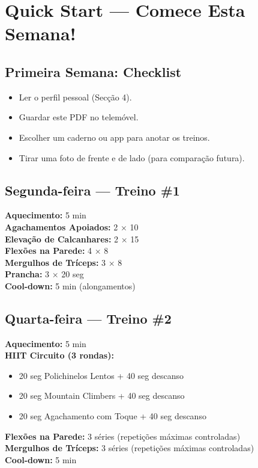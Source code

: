 \documentclass[12pt,a4paper]{scrartcl}
\begin{document}
\section{Quick Start — Comece Esta Semana!}
\subsection{Primeira Semana: Checklist}
\begin{itemize}
    \item[$\checkmark$] Ler o perfil pessoal (Secção 4).
    \item[$\checkmark$] Guardar este PDF no telemóvel.
    \item[$\checkmark$] Escolher um caderno ou app para anotar os treinos.
    \item[$\checkmark$] Tirar uma foto de frente e de lado (para comparação futura).
\end{itemize}

\subsection{Segunda-feira — Treino \#1}
\textbf{Aquecimento:} 5 min \\
\textbf{Agachamentos Apoiados:} 2 × 10 \\
\textbf{Elevação de Calcanhares:} 2 × 15 \\
\textbf{Flexões na Parede:} 4 × 8 \\
\textbf{Mergulhos de Tríceps:} 3 × 8 \\
\textbf{Prancha:} 3 × 20 seg \\
\textbf{Cool-down:} 5 min (alongamentos)

\subsection{Quarta-feira — Treino \#2}
\textbf{Aquecimento:} 5 min \\
\textbf{HIIT Circuito (3 rondas):}
\begin{itemize}
    \item 20 seg Polichinelos Lentos + 40 seg descanso
    \item 20 seg Mountain Climbers + 40 seg descanso
    \item 20 seg Agachamento com Toque + 40 seg descanso
\end{itemize}
\textbf{Flexões na Parede:} 3 séries (repetições máximas controladas) \\
\textbf{Mergulhos de Tríceps:} 3 séries (repetições máximas controladas) \\
\textbf{Cool-down:} 5 min
\end{document}
